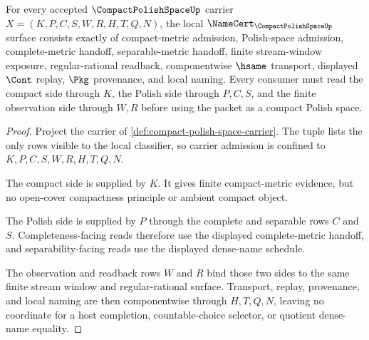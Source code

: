 \begin{theorem}
\label{thm:compact-polish-space-namecert-obligations}
For every accepted $\CompactPolishSpaceUp$ carrier $X=(K,P,C,S,W,R,H,T,Q,N)$, the local $\NameCert_{\CompactPolishSpaceUp}$ surface consists exactly of compact-metric admission, Polish-space admission, complete-metric handoff, separable-metric handoff, finite stream-window exposure, regular-rational readback, componentwise $\hsame$ transport, displayed $\Cont$ replay, $\Pkg$ provenance, and local naming. Every consumer must read the compact side through $K$, the Polish side through $P,C,S$, and the finite observation side through $W,R$ before using the packet as a compact Polish space.
\end{theorem}
\begin{proof}
Project the carrier of \autoref{def:compact-polish-space-carrier}. The tuple lists the only rows visible to the local classifier, so carrier admission is confined to $K,P,C,S,W,R,H,T,Q,N$.

The compact side is supplied by $K$. It gives finite compact-metric evidence, but no open-cover compactness principle or ambient compact object.

The Polish side is supplied by $P$ through the complete and separable rows $C$ and $S$. Completeness-facing reads therefore use the displayed complete-metric handoff, and separability-facing reads use the displayed dense-name schedule.

The observation and readback rows $W$ and $R$ bind those two sides to the same finite stream window and regular-rational surface. Transport, replay, provenance, and local naming are then componentwise through $H,T,Q,N$, leaving no coordinate for a host completion, countable-choice selector, or quotient dense-name equality.
\end{proof}

